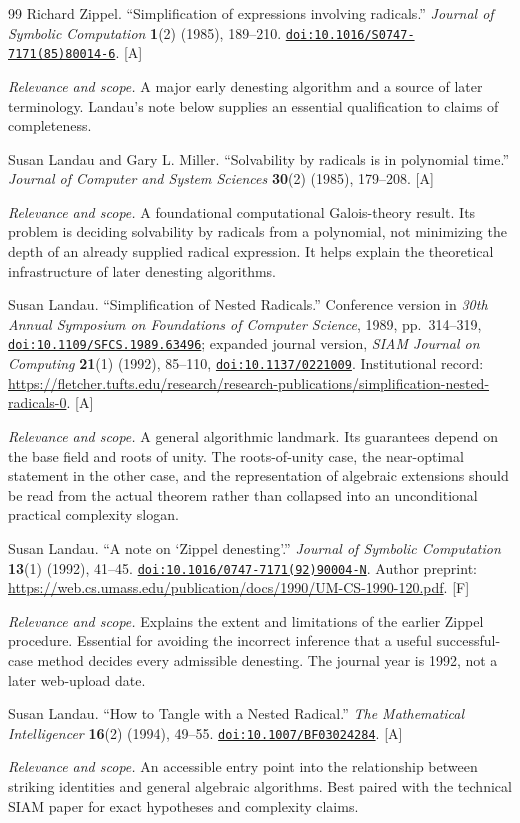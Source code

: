 \documentclass[11pt,letterpaper]{article}
\numberwithin{equation}{section}
\theoremstyle{definition}
\theoremstyle{remark}
\newcommand{\doi}[1]{\href{https://doi.org/#1}{\nolinkurl{doi:#1}}}
\newcommand{\status}[1]{\textsf{\small[#1]}}
\newcommand{\entrynote}[1]{\par\smallskip\noindent\emph{Relevance and scope.} #1}
\begin{document}
\begin{thebibliography}{99}
Richard Zippel. ``Simplification of expressions involving radicals.'' \emph{Journal of Symbolic Computation} \textbf{1}(2) (1985), 189--210. \doi{10.1016/S0747-7171(85)80014-6}. \status{A}
\entrynote{A major early denesting algorithm and a source of later terminology. Landau's note below supplies an essential qualification to claims of completeness.}

Susan Landau and Gary L. Miller. ``Solvability by radicals is in polynomial time.'' \emph{Journal of Computer and System Sciences} \textbf{30}(2) (1985), 179--208. \status{A}
\entrynote{A foundational computational Galois-theory result. Its problem is deciding solvability by radicals from a polynomial, not minimizing the depth of an already supplied radical expression. It helps explain the theoretical infrastructure of later denesting algorithms.}

Susan Landau. ``Simplification of Nested Radicals.'' Conference version in \emph{30th Annual Symposium on Foundations of Computer Science}, 1989, pp.~314--319, \doi{10.1109/SFCS.1989.63496}; expanded journal version, \emph{SIAM Journal on Computing} \textbf{21}(1) (1992), 85--110, \doi{10.1137/0221009}. Institutional record: \url{https://fletcher.tufts.edu/research/research-publications/simplification-nested-radicals-0}. \status{A}
\entrynote{A general algorithmic landmark. Its guarantees depend on the base field and roots of unity. The roots-of-unity case, the near-optimal statement in the other case, and the representation of algebraic extensions should be read from the actual theorem rather than collapsed into an unconditional practical complexity slogan.}

Susan Landau. ``A note on `Zippel denesting'.'' \emph{Journal of Symbolic Computation} \textbf{13}(1) (1992), 41--45. \doi{10.1016/0747-7171(92)90004-N}. Author preprint: \url{https://web.cs.umass.edu/publication/docs/1990/UM-CS-1990-120.pdf}. \status{F}
\entrynote{Explains the extent and limitations of the earlier Zippel procedure. Essential for avoiding the incorrect inference that a useful successful-case method decides every admissible denesting. The journal year is 1992, not a later web-upload date.}

Susan Landau. ``How to Tangle with a Nested Radical.'' \emph{The Mathematical Intelligencer} \textbf{16}(2) (1994), 49--55. \doi{10.1007/BF03024284}. \status{A}
\entrynote{An accessible entry point into the relationship between striking identities and general algebraic algorithms. Best paired with the technical SIAM paper for exact hypotheses and complexity claims.}


\end{thebibliography}
\end{document}
